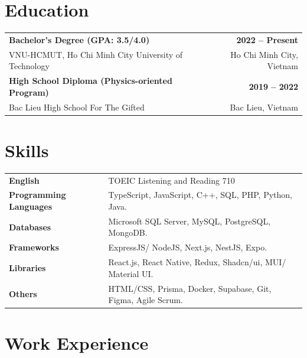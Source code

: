 \documentclass[a4paper,12pt]{article}
\begin{document}
\section{Education}
\begin{tabularx}{\linewidth}{@{}X r@{}}
\textbf{Bachelor's Degree (GPA: 3.5/4.0)} & \textbf{2022 -- Present} \\
VNU-HCMUT, Ho Chi Minh City University of Technology  & Ho Chi Minh City, Vietnam \\[6pt]
\textbf{High School Diploma (Physics-oriented Program)} & \textbf{2019 -- 2022} \\
Bac Lieu High School For The Gifted & Bac Lieu, Vietnam \\
\end{tabularx}

\section{Skills}
\begin{tabularx}{\linewidth}{@{}l X@{}}
\textbf{English} &  \normalsize{TOEIC Listening and Reading 710} \vspace{0.1cm} \\
\textbf{Programming Languages}  &  \normalsize{TypeScript, JavaScript, C++, SQL, PHP, Python, Java.} \vspace{0.1cm} \\
\textbf{Databases}  &  \normalsize{Microsoft SQL Server, MySQL, PostgreSQL, MongoDB.} \vspace{0.1cm} \\
\textbf{Frameworks} &  \normalsize{ExpressJS/ NodeJS, Next.js, NestJS, Expo.} \vspace{0.1cm} \\
\textbf{Libraries} &  \normalsize{React.js, React Native, Redux, Shadcn/ui, MUI/ Material UI.} \vspace{0.1cm} \\
\textbf{Others} &  \normalsize{HTML/CSS, Prisma, Docker, Supabase, Git, Figma, Agile Scrum.}\\
\end{tabularx}

\section{Work Experience}
\end{document}
